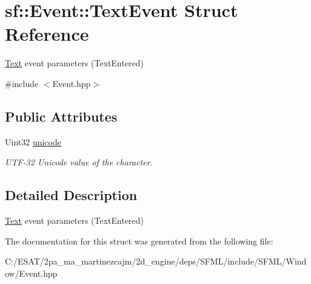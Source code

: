 \hypertarget{structsf_1_1_event_1_1_text_event}{}\section{sf\+:\+:Event\+:\+:Text\+Event Struct Reference}
\label{structsf_1_1_event_1_1_text_event}


\hyperlink{classsf_1_1_text}{Text} event parameters (Text\+Entered)  




{\ttfamily \#include $<$Event.\+hpp$>$}

\subsection*{Public Attributes}
\begin{DoxyCompactItemize}
\item 
\mbox{\label{structsf_1_1_event_1_1_text_event_a00d96b1a5328a1d7cbc276e161befcb0}} 
Uint32 \hyperlink{structsf_1_1_event_1_1_text_event_a00d96b1a5328a1d7cbc276e161befcb0}{unicode}
\begin{DoxyCompactList}\small\item\em U\+T\+F-\/32 Unicode value of the character. \end{DoxyCompactList}\end{DoxyCompactItemize}


\subsection{Detailed Description}
\hyperlink{classsf_1_1_text}{Text} event parameters (Text\+Entered) 

The documentation for this struct was generated from the following file\+:\begin{DoxyCompactItemize}
\item 
C\+:/\+E\+S\+A\+T/2pa\+\_\+ma\+\_\+martinezcajm/2d\+\_\+engine/deps/\+S\+F\+M\+L/include/\+S\+F\+M\+L/\+Window/Event.\+hpp\end{DoxyCompactItemize}
